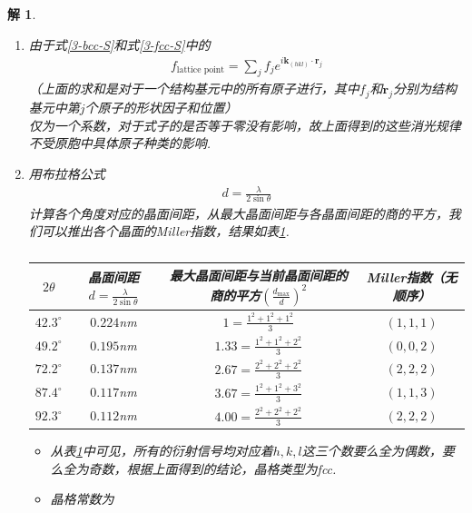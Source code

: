 \documentclass[UTF8,10pt,a4paper]{article}
\theoremstyle{Problem}
\theoremstyle{Solution}
\newtheorem*{sol}{解}
\begin{document}
\begin{sol}
\begin{enumerate}
\begin{itemize}
        \end{itemize}
        \item[(c)] 由于式\ref{3-bcc-S}和式\ref{3-fcc-S}中的
        \begin{align}
            \label{3-fLP}
            f_{\text{lattice point}}=\sum_jf_je^{i\bm{k}_{(hkl)}\cdot\bm{r}_j}
        \end{align}
        （上面的求和是对于一个结构基元中的所有原子进行，其中$f_j$和$\bm{r}_j$分别为结构基元中第$j$个原子的形状因子和位置）\\
        仅为一个系数，对于式子的是否等于零没有影响，故上面得到的这些消光规律不受原胞中具体原子种类的影响.
        \item[(d)] 用布拉格公式
        \begin{align}
            d=\frac{\lambda}{2\sin\theta}
        \end{align}
        计算各个角度对应的晶面间距，从最大晶面间距与各晶面间距的商的平方，我们可以推出各个晶面的Miller指数，结果如表\ref{3-T}.
        \begin{table}[h]
            \centering
            \caption{}
            \label{3-T}
            \begin{tabular}{cccc}
            \hline
            $2\theta$ & 晶面间距$d=\frac{\lambda}{2\sin\theta}$ & 最大晶面间距与当前晶面间距的商的平方$\left(\frac{d_{\max}}{d}\right)^2$ & Miller指数（无顺序） \\ \hline
            $42.3^{\circ}$ & $0.224$nm & $1=\frac{1^2+1^2+1^2}{3}$ & $(1,1,1)$ \\
            $49.2^{\circ}$ & $0.195$nm & $1.33=\frac{1^2+1^2+2^2}{3}$ & $(0,0,2)$ \\
            $72.2^{\circ}$ & $0.137$nm & $2.67=\frac{2^2+2^2+2^2}{3}$ & $(2,2,2)$ \\
            $87.4^{\circ}$ & $0.117$nm & $3.67=\frac{1^2+1^2+3^2}{3}$ & $(1,1,3)$ \\
            $92.3^{\circ}$ & $0.112$nm & $4.00=\frac{2^2+2^2+2^2}{3}$ & $(2,2,2)$ \\ \hline
            \end{tabular}
        \end{table}
        \begin{itemize}
            \item[$\triangleright$] 从表\ref{3-T}中可见，所有的衍射信号均对应着$h,k,l$这三个数要么全为偶数，要么全为奇数，根据上面得到的结论，晶格类型为fcc.
            \item[$\triangleright$] 晶格常数为
            \begin{align}

\end{align}
\end{itemize}
\end{enumerate}
\end{sol}
\end{document}
